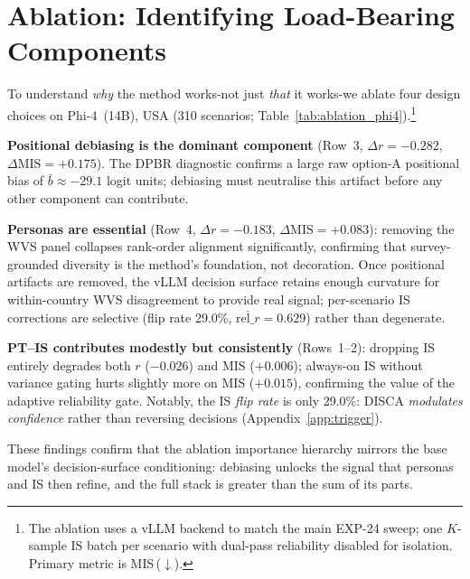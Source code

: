 \documentclass{article}
\begin{document}
\section{Ablation: Identifying Load-Bearing Components}
\label{sec:ablation}

To understand \emph{why} the method works-not just \emph{that} it works-we
ablate four design choices on Phi-4~(14B), USA (310 scenarios;
Table~\ref{tab:ablation_phi4}).\footnote{The ablation uses a vLLM backend to match
the main EXP-24 sweep; one $K$-sample IS batch per scenario with dual-pass
reliability disabled for isolation. Primary metric is MIS\,($\downarrow$).}

\textbf{Positional debiasing is the dominant component} (Row~3,
$\Delta r = -0.282$, $\Delta\text{MIS} = +0.175$).
The DPBR diagnostic confirms a large raw option-A positional bias of
$\bar{b} \approx -29.1$ logit units; debiasing must neutralise this artifact before
any other component can contribute.

\textbf{Personas are essential} (Row~4, $\Delta r = -0.183$,
$\Delta\text{MIS} = +0.083$): removing the WVS panel collapses rank-order alignment
significantly, confirming that survey-grounded diversity is the method's foundation,
not decoration.
Once positional artifacts are removed, the vLLM decision surface retains enough
curvature for within-country WVS disagreement to provide real signal; per-scenario IS
corrections are selective (flip rate 29.0\%, $\overline{\text{rel}\_r} = 0.629$)
rather than degenerate.

\textbf{PT--IS contributes modestly but consistently} (Rows~1--2): dropping IS
entirely degrades both $r$ ($-0.026$) and MIS ($+0.006$); always-on IS without
variance gating hurts slightly more on MIS ($+0.015$), confirming the value of the
adaptive reliability gate.
Notably, the IS \emph{flip rate} is only 29.0\%: DISCA \emph{modulates confidence}
rather than reversing decisions (Appendix~\ref{app:trigger}).

These findings confirm that the ablation importance hierarchy mirrors the base model's
decision-surface conditioning: debiasing unlocks the signal that personas and IS then
refine, and the full stack is greater than the sum of its parts.
\end{document}

